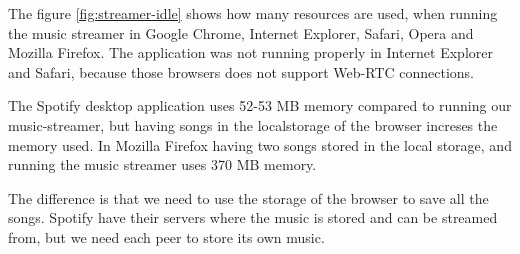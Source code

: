 The figure \ref{fig:streamer-idle} shows how many resources are used,
when running the music streamer in Google Chrome, Internet Explorer, Safari, Opera and Mozilla Firefox.
The application was not running properly in Internet Explorer and Safari, because those browsers does not support Web-RTC connections.

The Spotify desktop application uses 52-53 MB memory compared to running our music-streamer,
but having songs in the localstorage of the browser increses the memory used. 
In Mozilla Firefox having two songs stored in the local storage,
and running the music streamer uses 370 MB memory.

The difference is that we need to use the storage of the browser to save all the songs.
Spotify have their servers where the music is stored and can be streamed from,
but we need each peer to store its own music.



